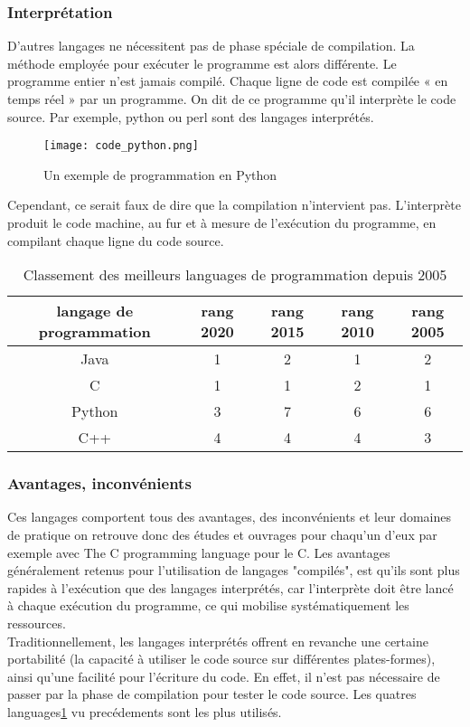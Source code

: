 \documentclass[12pt,a4paper]{article}
\begin{document}
\subsubsection{Interprétation}
D'autres langages ne nécessitent pas de phase spéciale de compilation. 
La méthode employée pour exécuter le programme est alors différente. Le
programme entier n'est jamais compilé. Chaque ligne de code est 
compilée « en temps réel » par un programme. On dit de ce programme 
qu'il interprète le code source. Par exemple, python ou perl sont des 
langages interprétés.\\
\begin{figure}[ht]
 \centering
  \texttt{[image: code\_python.png]}
  \caption{Un exemple de programmation en Python}
  \label{fig:Un exemple de programmation en Python}
\end{figure}
\newpage
Cependant, ce serait faux de dire que la compilation n'intervient pas. 
L'interprète produit le code machine, au fur et à mesure de l'exécution
du programme, en compilant chaque ligne du code source.\\
\begin{table}
\centering
 \begin{tabular}{|c|c|c|c|c|} \\ \hline
  langage de programmation & rang 2020 & rang 2015 & rang 2010 & rang 2005 \\
  \hline
  Java    & 1 & 2 & 1 & 2 \\ \hline
  C       & 1 & 1 & 2 & 1 \\ \hline
  Python  & 3 & 7 & 6 & 6 \\ \hline
  C++     & 4 & 4 & 4 & 3 \\ \hline
 \end{tabular}
  \caption{Classement des meilleurs languages de programmation depuis 2005}
  \label{2}
  \end{table}
\subsubsection{Avantages, inconvénients}
Ces langages comportent tous des avantages, des inconvénients et leur domaines 
de pratique on retrouve donc des études et ouvrages pour chaqu'un d'eux par 
exemple avec The C programming language\cite{livre1} pour le C.
Les avantages généralement retenus pour l'utilisation de langages 
"compilés", est qu'ils sont plus rapides à l'exécution que des langages
interprétés, car l'interprète doit être lancé à chaque exécution du
programme, ce qui mobilise systématiquement les ressources.\\
Traditionnellement, les langages interprétés offrent en revanche une 
certaine portabilité (la capacité à utiliser le code source sur 
différentes plates-formes), ainsi qu'une facilité pour l'écriture du 
code. En effet, il n'est pas nécessaire de passer par la phase de 
compilation pour tester le code source. Les quatres languages\ref{2} vu 
precédements sont les plus utilisés.
\end{document}
